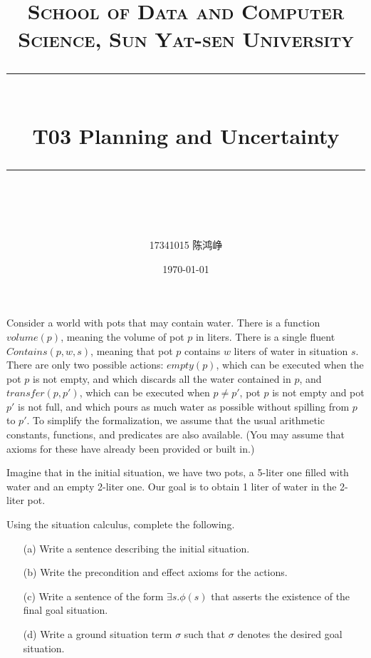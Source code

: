 \documentclass[a4paper, 11pt]{article}
\title{
\normalfont \normalsize
\textsc{School of Data and Computer Science, Sun Yat-sen University} \\ [25pt] %
\rule{\textwidth}{0.5pt} \\[0.4cm] %
\huge  T03 Planning and Uncertainty\\ %
\rule{\textwidth}{2pt} \\[0.5cm] %
\author{17341015 陈鸿峥}
\date{\normalsize\today}
}
\begin{document}
\maketitle

\newpage
\begin{question}\normalfont
Consider a world with pots that may contain water. There is a function $volume(p)$, meaning the volume of pot $p$ in liters. There is a single fluent $Contains(p, w, s)$, meaning that pot $p$ contains $w$ liters of water in situation $s$. There are only two possible actions: $empty(p)$, which can be executed when the pot $p$ is not empty, and which discards all the water contained in $p$, and $transfer(p, p')$, which can be executed when $p \ne p'$, pot $p$ is not empty and pot $p'$ is not full, and which pours as much water as possible without spilling from $p$ to $p'$. To simplify the formalization, we assume that the usual arithmetic constants, functions, and predicates are also available. (You may assume that axioms for these have already been provided or built in.)

Imagine that in the initial situation, we have two pots, a 5-liter one filled with water and an empty 2-liter one. Our goal is to obtain 1 liter of water in the 2-liter pot.

Using the situation calculus, complete the following.
\begin{itemize}
    \item [(a)] Write a sentence describing the initial situation.
    \item [(b)] Write the precondition and effect axioms for the actions.
    \item [(c)] Write a sentence of the form $\exists s.\phi(s)$ that asserts the existence of the final goal situation.
    \item [(d)] Write a ground situation term $\sigma$ such that $\sigma$ denotes the desired goal situation.
\end{itemize}
\end{question}
\end{document}
